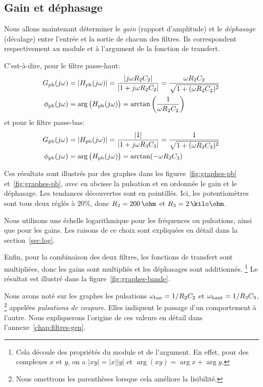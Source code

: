 \subsection{Gain et déphasage}

Nous allons maintenant déterminer
le \emph{gain} (rapport d'amplitude) et le  \emph{déphasage} (décalage)
entre l'entrée et la sortie de chacun des filtres.
Ils correspondent respectivement au module et à l'argument de la fonction de
transfert.

C'est-à-dire, pour le filtre passe-haut:
\begin{align}
    G_{\mathrm{ph}}(j\omega) &= |H_{\mathrm{ph}}(j\omega)|
    = \frac{|j\omega R_2C_2|}{|1 + j\omega R_2C_2|}
    = \frac{\omega R_2C_2}{\sqrt{1+(\omega R_2C_2)^2}}\\
    \phi_{\mathrm{ph}}(j\omega) &= \arg\big(H_{\mathrm{ph}}(j\omega)\big)
    = \arctan\left(\frac{1}{\omega R_2C_2}\right)
\end{align}
et pour le filtre passe-bas:
\begin{align}
    G_{\mathrm{pb}}(j\omega) &= |H_{\mathrm{pb}}(j\omega)|
    = \frac{|1|}{|1 + j\omega R_3C_3|}
    = \frac{1}{\sqrt{1+(\omega R_3C_3)^2}}\\
    \phi_{\mathrm{pb}}(j\omega) &= \arg\big(H_{\mathrm{pb}}(j\omega)\big)
    = \arctan(-\omega R_3C_3)
\end{align}

Ces résultats sont illustrés par des graphes dans
les figures~\ref{fig:graphes-pb} et~\ref{fig:graphes-pb},
avec en abcisse la pulsation
et en ordonnée le gain et le déphasage.
Les tendances découvertes sont en pointillés.
Ici, les potentiomètres sont tous deux réglés à $20\%$,
donc $R_2 = 200\,\ohm$ et $R_3 = 2\,\kilo\ohm$.

Nous utilisons une échelle logarithmique pour les fréquences
ou pulsations, ainsi que pour les gains.
Les raisons de ce choix sont expliquées en détail dans
la section~\ref{sec:log}.

Enfin, pour la combinaison des deux filtres,
les fonctions de transfert sont multipliées,
donc les gains sont multipliés et les déphasages sont additionnés.%
\footnote{
    Cela découle des propriétés du module et de l'argument.
    En effet, pour des complexes $x$ et $y$,
    on a $|xy| = |x||y|$ et $\arg(xy) = \arg x + \arg y$.
}
Le résultat est illustré dans la figure~\ref{fig:graphes-bande}.

Nous avons noté sur les graphes les pulsations
$\omega_{\mathrm{bas}} = 1/R_2C_2$ et $\omega_{\mathrm{haut}}=1/R_3C_3$,%
\footnote{Nous omettrons les parenthèses lorsque cela améliore la lisibilité.}
appelées \emph{pulsations de coupure}.
Elles indiquent le passage d'un comportement à l'autre.
Nous expliquerons l'origine de ces valeurs en détail dans
l'annexe~\ref{chap:filtres-gen}.
